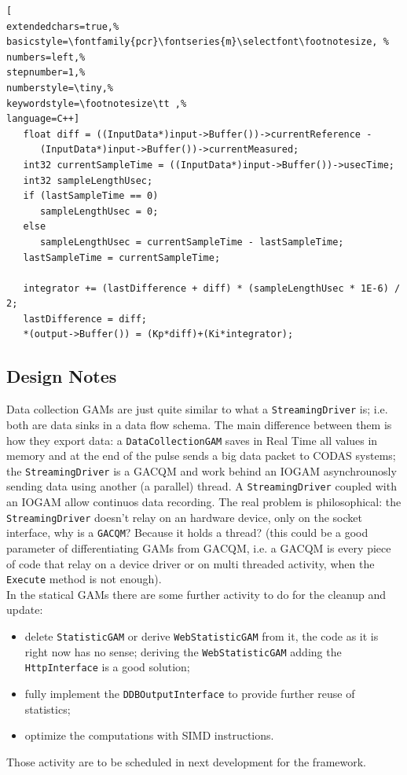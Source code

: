 \begin{lstlisting}[
extendedchars=true,%
basicstyle=\fontfamily{pcr}\fontseries{m}\selectfont\footnotesize, %
numbers=left,%
stepnumber=1,%
numberstyle=\tiny,%
keywordstyle=\footnotesize\tt ,%
language=C++]
   float diff = ((InputData*)input->Buffer())->currentReference -
      (InputData*)input->Buffer())->currentMeasured;
   int32 currentSampleTime = ((InputData*)input->Buffer())->usecTime;
   int32 sampleLengthUsec;
   if (lastSampleTime == 0)
      sampleLengthUsec = 0;
   else
      sampleLengthUsec = currentSampleTime - lastSampleTime;
   lastSampleTime = currentSampleTime;

   integrator += (lastDifference + diff) * (sampleLengthUsec * 1E-6) / 2;
   lastDifference = diff;
   *(output->Buffer()) = (Kp*diff)+(Ki*integrator);
\end{lstlisting}



\subsection{Design Notes}
Data collection GAMs are just quite similar to what a \texttt{StreamingDriver} is; i.e. both are data sinks in a data flow schema. The main difference between them is how they export data: a \texttt{DataCollectionGAM} saves in Real Time all values in memory and at the end of the pulse sends a big data packet to CODAS systems; the \texttt{StreamingDriver} is a GACQM and work behind an IOGAM asynchrounosly sending data using another (a parallel) thread. A \texttt{StreamingDriver} coupled with an IOGAM allow continuos data recording. The real problem is philosophical: the \texttt{StreamingDriver} doesn't relay on an hardware device, only on the socket interface, why is a \texttt{GACQM}? Because it holds a thread? (this could be a good parameter of differentiating GAMs from GACQM, i.e. a GACQM is every piece of code that relay on a device driver or on multi threaded activity, when the \texttt{Execute} method is not enough). \\


In the statical GAMs there are some further activity to do for the cleanup and update:
\begin{itemize}
 \item delete \texttt{StatisticGAM} or derive \texttt{WebStatisticGAM} from it, the code as it is right now has no sense; deriving the \texttt{WebStatisticGAM} adding the \texttt{HttpInterface} is a good solution;
 \item fully implement the \texttt{DDBOutputInterface} to provide further reuse of statistics;
 \item optimize the computations with SIMD instructions.
\end{itemize}
Those activity are to be scheduled in next development for the framework. \\


